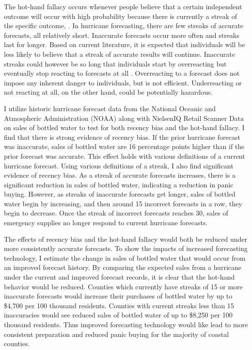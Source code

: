 \documentclass{article}
\begin{document}
The hot-hand fallacy occurs whenever people believe that a certain independent outcome will occur with high probability because there is currently a streak of the specific outcome, \citep{croson2005gambler, stockl2015hot, studer2015put, miller2024cold}. In hurricane forecasting, there are few streaks of accurate forecasts, all relatively short. Inaccurate forecasts occur more often and streaks last for longer. Based on current literature, it is expected that individuals will be less likely to believe that a streak of accurate results will continue. Inaccurate streaks could however be so long that individuals start by overreacting but eventually stop reacting to forecasts at all \citep{rabin2010gambler}. Overreacting to a forecast does not impose any inherent danger to individuals, but is not efficient. Underreacting or not reacting at all, on the other hand, could be potentially hazardous.

I utilize historic hurricane forecast data from the National Oceanic and Atmospheric Administration (NOAA) along with NielsenIQ Retail Scanner Data on sales of bottled water to test for both recency bias and the hot-hand fallacy. I find that there is strong evidence of recency bias. If the prior hurricane forecast was inaccurate, sales of bottled water are 16 percentage points higher than if the prior forecast was accurate. This effect holds with various definitions of a current hurricane forecast. 
Using various definitions of a streak, I also find significant evidence of recency bias. As a streak of accurate forecasts increases, there is a significant reduction in sales of bottled water, indicating a reduction in panic buying. However, as streaks of inaccurate forecasts get longer, sales of bottled water begin by increasing, and then around 15 incorrect forecasts in a row, they begin to decrease. Once the streak of incorrect forecasts reaches 30, sales of emergency supplies no longer respond to current hurricane forecasts. 

The effects of recency bias and the hot-hand fallacy would both be reduced under more consistently accurate forecasts. To show the impacts of increased forecasting technology, I estimate the change in sales of bottled water that would occur from an improved forecast history. By comparing the expected sales from a hurricane under the current and improved forecast records, it is clear that the hot-hand behavior would be reduced. Counties which currently have streaks of 15 or more inaccurate forecasts would increase their purchases of bottled water by up to \$4,700 per 100 thousand residents. Counties with current streaks less than 15 inaccuracies would see reduced sales of bottled water of up to \$8,250 per 100 thousand residents. Thus improved forecasting technology would like lead to more consistent preparation and reduced panic buying for the majority of coastal counties. 
\end{document}
